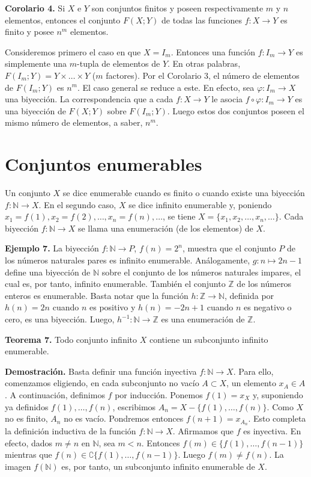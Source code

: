 \textbf{Corolario 4.} Si \( X \) e \( Y \) son conjuntos finitos y poseen respectivamente \( m \) y \( n \) elementos, entonces el conjunto \( F(X;Y) \) de todas las funciones \( f: X \to Y \) es finito y posee \( n^m \) elementos.

Consideremos primero el caso en que \( X = I_m \). Entonces una función \( f: I_m \to Y \) es simplemente una \( m \)-tupla de elementos de \( Y \). En otras palabras, \( F(I_m;Y) = Y \times \dots \times Y \) (\( m \) factores). Por el Corolario 3, el número de elementos de \( F(I_m;Y) \) es \( n^m \). El caso general se reduce a este. En efecto, sea \( \varphi: I_m \to X \) una biyección. La correspondencia que a cada \( f: X \to Y \) le asocia \( f \circ \varphi: I_m \to Y \) es una biyección de \( F(X;Y) \) sobre \( F(I_m;Y) \). Luego estos dos conjuntos poseen el mismo número de elementos, a saber, \( n^m \).

\section{Conjuntos enumerables}

Un conjunto \( X \) se dice enumerable cuando es finito o cuando existe una biyección \( f: \mathbb{N} \to X \). En el segundo caso, \( X \) se dice infinito enumerable y, poniendo \( x_1 = f(1), x_2 = f(2), \dots, x_n = f(n), \dots \), se tiene \( X = \{x_1, x_2, \dots, x_n, \dots\} \). Cada biyección \( f: \mathbb{N} \to X \) se llama una enumeración (de los elementos) de \( X \).

\textbf{Ejemplo 7.} La biyección \( f: \mathbb{N} \to P \), \( f(n) = 2^n \), muestra que el conjunto \( P \) de los números naturales pares es infinito enumerable. Análogamente, \( g: n \mapsto 2n-1 \) define una biyección de \( \mathbb{N} \) sobre el conjunto de los números naturales impares, el cual es, por tanto, infinito enumerable. También el conjunto \( \mathbb{Z} \) de los números enteros es enumerable. Basta notar que la función \( h: \mathbb{Z} \to \mathbb{N} \), definida por \( h(n) = 2n \) cuando \( n \) es positivo y \( h(n) = -2n + 1 \) cuando \( n \) es negativo o cero, es una biyección. Luego, \( h^{-1}: \mathbb{N} \to \mathbb{Z} \) es una enumeración de \( \mathbb{Z} \).

\textbf{Teorema 7.} Todo conjunto infinito \( X \) contiene un subconjunto infinito enumerable.

\textbf{Demostración.} Basta definir una función inyectiva \( f: \mathbb{N} \to X \). Para ello, comenzamos eligiendo, en cada subconjunto no vacío \( A \subset X \), un elemento \( x_A \in A \). A continuación, definimos \( f \) por inducción. Ponemos \( f(1) = x_X \) y, suponiendo ya definidos \( f(1), \dots, f(n) \), escribimos \( A_n = X - \{f(1), \dots, f(n)\} \). Como \( X \) no es finito, \( A_n \) no es vacío. Pondremos entonces \( f(n+1) = x_{A_n} \). Esto completa la definición inductiva de la función \( f: \mathbb{N} \to X \). Afirmamos que \( f \) es inyectiva. En efecto, dados \( m \neq n \) en \( \mathbb{N} \), sea \( m < n \). Entonces \( f(m) \in \{f(1), \dots, f(n-1)\} \) mientras que \( f(n) \in \complement \{f(1), \dots, f(n-1)\} \). Luego \( f(m) \neq f(n) \). La imagen \( f(\mathbb{N}) \) es, por tanto, un subconjunto infinito enumerable de \( X \).

